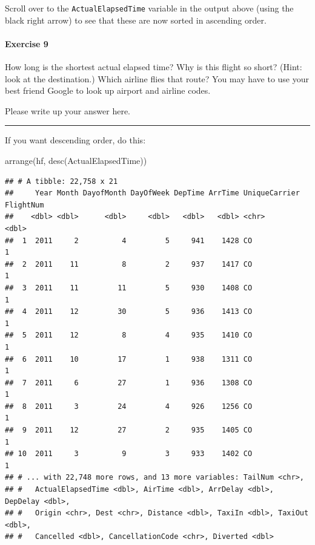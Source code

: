 \documentclass[
]{book}
\newenvironment{Shaded}{\begin{snugshade}}{\end{snugshade}}
\newcommand{\FunctionTok}[1]{\textcolor[rgb]{0.00,0.00,0.00}{#1}}
\newcommand{\NormalTok}[1]{#1}
\begin{document}
Scroll over to the \texttt{ActualElapsedTime} variable in the output above (using the black right arrow) to see that these are now sorted in ascending order.

\hypertarget{exercise-9}{%
\paragraph*{Exercise 9}\label{exercise-9}}

How long is the shortest actual elapsed time? Why is this flight so short? (Hint: look at the destination.) Which airline flies that route? You may have to use your best friend Google to look up airport and airline codes.

Please write up your answer here.

\begin{center}\rule{0.5\linewidth}{0.5pt}\end{center}

If you want descending order, do this:

\begin{Shaded}
\begin{Highlighting}[]
\FunctionTok{arrange}\NormalTok{(hf, }\FunctionTok{desc}\NormalTok{(ActualElapsedTime))}
\end{Highlighting}
\end{Shaded}

\begin{verbatim}
## # A tibble: 22,758 x 21
##     Year Month DayofMonth DayOfWeek DepTime ArrTime UniqueCarrier FlightNum
##    <dbl> <dbl>      <dbl>     <dbl>   <dbl>   <dbl> <chr>             <dbl>
##  1  2011     2          4         5     941    1428 CO                    1
##  2  2011    11          8         2     937    1417 CO                    1
##  3  2011    11         11         5     930    1408 CO                    1
##  4  2011    12         30         5     936    1413 CO                    1
##  5  2011    12          8         4     935    1410 CO                    1
##  6  2011    10         17         1     938    1311 CO                    1
##  7  2011     6         27         1     936    1308 CO                    1
##  8  2011     3         24         4     926    1256 CO                    1
##  9  2011    12         27         2     935    1405 CO                    1
## 10  2011     3          9         3     933    1402 CO                    1
## # ... with 22,748 more rows, and 13 more variables: TailNum <chr>,
## #   ActualElapsedTime <dbl>, AirTime <dbl>, ArrDelay <dbl>, DepDelay <dbl>,
## #   Origin <chr>, Dest <chr>, Distance <dbl>, TaxiIn <dbl>, TaxiOut <dbl>,
## #   Cancelled <dbl>, CancellationCode <chr>, Diverted <dbl>
\end{verbatim}
\end{document}
